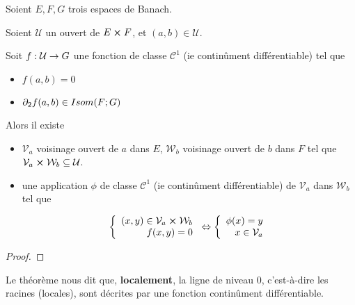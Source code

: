 \begin{theorem}
	\label{theorem:implicite_functions}
	Soient $E, F, G$ trois espaces de Banach.

	Soient $\mathcal{U}$ un ouvert de $E \cross F$, et $(a, b) \in
	\mathcal{U}$.

	Soit $f : \mathcal{U} \rightarrow G$ une fonction de classe
	$\mathcal{C}^{1}$ (ie continûment différentiable) tel que

	\begin{itemize}
		\item $f(a, b) = 0$
		\item $\partial_{2}f (a, b) \in Isom(F; G)$
	\end{itemize}

	Alors il existe

	\begin{itemize}
		\item $\mathcal{V}_{a}$ voisinage ouvert de $a$ dans $E$,
			$\mathcal{W}_{b}$ voisinage ouvert de $b$ dans $F$ tel que
			$\mathcal{V}_{a} \cross \mathcal{W}_{b} \subseteq \mathcal{U}$.
		\item une application $\phi$ de classe $\mathcal{C}^{1}$ (ie continûment
			différentiable) de $\mathcal{V}_{a}$ dans $\mathcal{W}_{b}$ tel que

			\begin{align*}
			\left\{
				\begin{array}{r c l}
					(x, y) \in \mathcal{V}_{a} \cross \mathcal{W}_{b} \\
					f(x, y) = 0
				\end{array}
			\right.
			\Leftrightarrow
			\left\{
				\begin{array}{r c l}
					\phi(x) = y \\
					x \in \mathcal{V}_{a}
				\end{array}
			\right.
			\end{align*}
	\end{itemize}
\end{theorem}

\ifdefined\outputproof
\begin{proof}

\end{proof}
\fi

\begin{remarque}
	Le théorème nous dit que, \textbf{localement}, la ligne de niveau $0$,
	c'est-à-dire les racines (locales), sont décrites par une fonction
	continûment différentiable.
\end{remarque}

